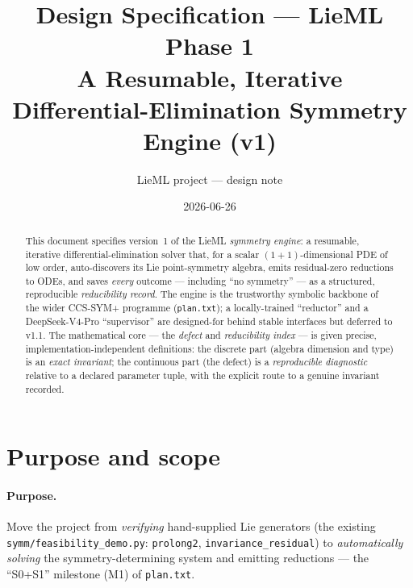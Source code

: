 \documentclass[11pt]{article}
\title{\bf Design Specification --- LieML Phase 1\\[2pt]
\large A Resumable, Iterative Differential-Elimination Symmetry Engine (v1)}
\author{LieML project --- design note}
\date{2026-06-26}
\theoremstyle{definition}
\theoremstyle{remark}
\begin{document}
\maketitle

\begin{abstract}
This document specifies version~1 of the LieML \emph{symmetry engine}: a resumable, iterative
differential-elimination solver that, for a scalar $(1{+}1)$-dimensional PDE of low order,
auto-discovers its Lie point-symmetry algebra, emits residual-zero reductions to ODEs, and saves
\emph{every} outcome --- including ``no symmetry'' --- as a structured, reproducible
\emph{reducibility record}. The engine is the trustworthy symbolic backbone of the wider CCS-SYM+
programme (\texttt{plan.txt}); a locally-trained ``reductor'' and a DeepSeek-V4-Pro ``supervisor''
are designed-for behind stable interfaces but deferred to v1.1. The mathematical core --- the
\emph{defect} and \emph{reducibility index} --- is given precise, implementation-independent
definitions: the discrete part (algebra dimension and type) is an \emph{exact invariant}; the
continuous part (the defect) is a \emph{reproducible diagnostic} relative to a declared parameter
tuple, with the explicit route to a genuine invariant recorded.
\end{abstract}

\tableofcontents

\section{Purpose and scope}

\paragraph{Purpose.} Move the project from \emph{verifying} hand-supplied Lie generators
(the existing \texttt{symm/feasibility\_demo.py}: \texttt{prolong2}, \texttt{invariance\_residual})
to \emph{automatically solving} the symmetry-determining system and emitting reductions --- the
``S0+S1'' milestone (M1) of \texttt{plan.txt}.
\end{document}
